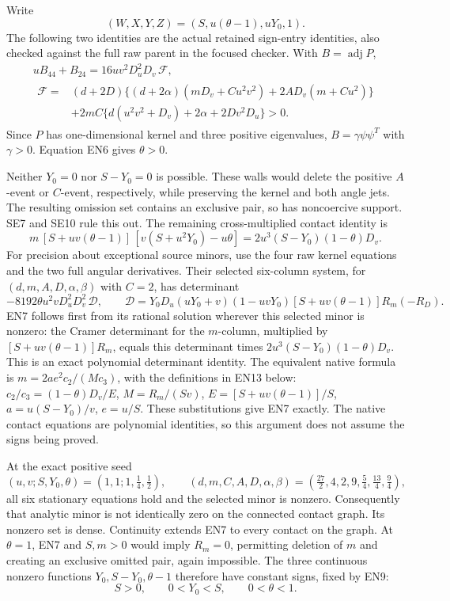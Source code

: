 Write
\[
 (W,X,Y,Z)=(S,u(\theta-1),uY_0,1).
 \tag{EN5}
\]
The following two identities are the actual retained sign-entry
identities, also checked against the full raw parent in the focused
checker.  With \(B=\operatorname{adj}P\),
\[
\begin{gathered}
 uB_{44}+B_{24}
 =16uv^2D_u^2D_v\,\mathcal F,\\
\begin{aligned}
 \mathcal F={}&(d+2D)\{(d+2\alpha)(mD_v+Cu^2v^2)
                       +2AD_v(m+Cu^2)\}\\
 &+2mC\{d(u^2v^2+D_v)+2\alpha+2Dv^2D_u\}>0 .
\end{aligned}
\end{gathered}\tag{EN6}
\]
Since \(P\) has one-dimensional kernel and three positive eigenvalues,
\(B=\gamma\psi\psi^T\) with \(\gamma>0\).  Equation EN6 gives
\(\theta>0\).

Neither \(Y_0=0\) nor \(S-Y_0=0\) is possible.  These walls would delete
the positive \(A\)-event or \(C\)-event, respectively, while preserving
the kernel and both angle jets.  The resulting omission set contains
an exclusive pair, so has noncoercive support.  SE7 and SE10 rule this out.
The remaining cross-multiplied contact identity is
\[
 m\,[S+uv(\theta-1)]\,
       [v(S+u^2Y_0)-u\theta]
   =2u^3(S-Y_0)(1-\theta)D_v .
 \tag{EN7}
\]
For precision about exceptional source minors, use the four raw kernel
equations and the two full angular derivatives.  Their selected six-column
system, for \((d,m,A,D,\alpha,\beta)\) with \(C=2\), has
determinant
\[
 -8192\theta u^2vD_u^2D_v^2\,\mathcal D,\qquad
 \mathcal D=Y_0D_u(uY_0+v)(1-uvY_0)
 [S+uv(\theta-1)]R_m(-R_D).
 \tag{EN8}
\]
EN7 follows first from its rational solution wherever this selected
minor is nonzero: the Cramer determinant for the \(m\)-column,
multiplied by \([S+uv(\theta-1)]R_m\), equals this determinant
times \(2u^3(S-Y_0)(1-\theta)D_v\).  This is an exact
polynomial determinant identity.  The equivalent native formula is
\(m=2ae^2c_2/(Mc_3)\), with the definitions in EN13 below:
\(c_2/c_3=(1-\theta)D_v/E\),
\(M=R_m/(Sv)\), \(E=[S+uv(\theta-1)]/S\),
\(a=u(S-Y_0)/v\), \(e=u/S\).  These substitutions give EN7
exactly.  The native contact equations are polynomial identities, so
this argument does not assume the signs being proved.

At the exact positive seed
\[
 (u,v;S,Y_0,\theta)=(1,1;1,\tfrac14,\tfrac12),\qquad
 (d,m,C,A,D,\alpha,\beta)
 =(\tfrac{27}2,4,2,9,\tfrac54,\tfrac{13}4,\tfrac94),
 \tag{EN9}
\]
all six stationary equations hold and the selected minor is nonzero.
Consequently that analytic minor is not identically zero on the
connected contact graph.  Its nonzero set is dense.  Continuity extends
EN7 to every contact on the graph.  At \(\theta=1\), EN7 and \(S,m>0\)
would imply \(R_m=0\), permitting deletion of \(m\) and creating an
exclusive omitted pair, again impossible.  The three continuous
nonzero functions \(Y_0,S-Y_0,\theta-1\) therefore have constant signs,
fixed by EN9:
\[
 S>0,\qquad 0<Y_0<S,\qquad 0<\theta<1.
 \tag{EN10}
\]

